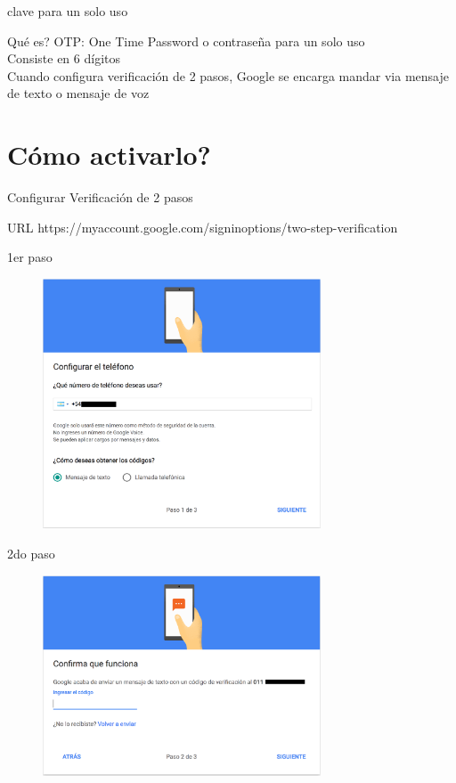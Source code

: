 \documentclass[11pt]{beamer}
\begin{document}
\begin{frame}{clave para un solo uso}
  \begin{block}{Qu\'e es?}
    OTP: One Time Password o contrase\~na para un solo uso\\
    Consiste en 6 d\'igitos\\
    Cuando configura verificaci\'on de 2 pasos, Google se encarga mandar via
    mensaje de texto o mensaje de voz
  \end{block}
\end{frame}
\section{C\'omo activarlo?}
\begin{frame}{Configurar Verificaci\'on de 2 pasos}
  \begin{block}{URL}
    https://myaccount.google.com/signinoptions/two-step-verification
  \end{block}
\end{frame}
\begin{frame}{1er paso}
  \begin{figure}
    \includegraphics[width=3.25in]{images/1paso.png}
  \end{figure}
\end{frame}
\begin{frame}{2do paso}
  \begin{figure}
    \includegraphics[width=3.25in]{images/2paso.png}
  \end{figure}
\end{frame}
\end{document}
